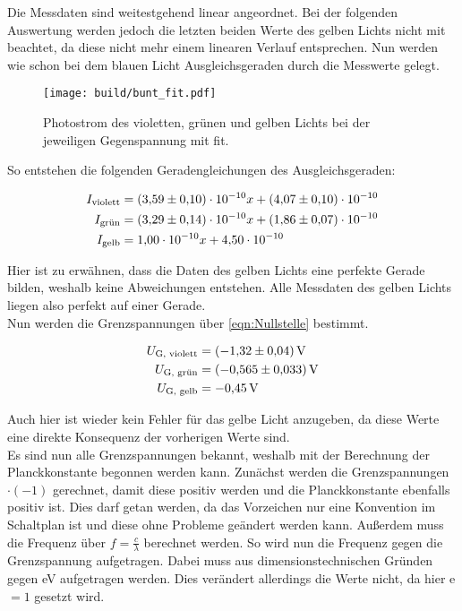 \noindent Die Messdaten sind weitestgehend linear angeordnet. Bei der folgenden Auswertung werden jedoch die letzten beiden Werte des 
gelben Lichts nicht mit beachtet, da diese nicht mehr einem linearen Verlauf entsprechen. Nun werden wie schon bei dem blauen Licht 
Ausgleichsgeraden durch die Messwerte gelegt.

\begin{figure}[H]
    \centering
    \texttt{[image: build/bunt\_fit.pdf]}
    \caption{Photostrom des violetten, grünen und gelben Lichts bei der jeweiligen Gegenspannung mit fit.}
    \label{fig:bunt_fit}
\end{figure}

\noindent So entstehen die folgenden Geradengleichungen des Ausgleichsgeraden:

\begin{align*}
    I_\text{violett} &= \num {3.59\pm0.10e-10} x + \num{4.07\pm0.10e-10}\\
    I_\text{grün}    &= \num {3.29\pm0.14e-10} x + \num{1.86\pm0.07e-10}\\
    I_\text{gelb}    &= \num {1.00\pm0.00e-10} x + \num{4.50\pm0.00e-10}\\
\end{align*}

\noindent Hier ist zu erwähnen, dass die Daten des gelben Lichts eine perfekte Gerade bilden, weshalb keine Abweichungen entstehen. 
Alle Messdaten des gelben Lichts liegen also perfekt auf einer Gerade. \\
\noindent Nun werden die Grenzspannungen über \autoref{eqn:Nullstelle} bestimmt.

\begin{align}
    U_\text{G, violett} &= \qty{-1.32 \pm 0.04}{\volt}\\
    U_\text{G, grün} &= \qty{-0.565 \pm 0.033}{\volt}\\
    U_\text{G, gelb} &= \qty{-0.45 \pm 0.00}{\volt}
\end{align}

\noindent Auch hier ist wieder kein Fehler für das gelbe Licht anzugeben, da diese Werte eine direkte Konsequenz der vorherigen Werte sind.\\
\noindent Es sind nun alle Grenzspannungen bekannt, weshalb mit der Berechnung der Planckkonstante begonnen werden kann. Zunächst werden die 
Grenzspannungen $\cdot (-1)$ gerechnet, damit diese positiv werden und die Planckkonstante ebenfalls positiv ist. Dies darf getan werden, da 
das Vorzeichen nur eine Konvention im Schaltplan ist und diese ohne Probleme geändert werden kann. Außerdem muss die Frequenz über 
$f=\frac{c}{\lambda}$ berechnet werden. So wird nun die Frequenz gegen die Grenzspannung aufgetragen. Dabei muss aus dimensionstechnischen 
Gründen gegen eV aufgetragen werden. Dies verändert allerdings die Werte nicht, da hier e$=1$ gesetzt wird. 

